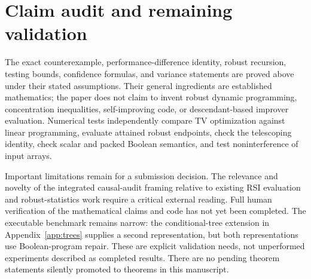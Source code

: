 \section{Claim audit and remaining validation}\label{app:claims}
The exact counterexample, performance-difference identity, robust recursion, testing bounds, confidence formulas, and variance statements are proved above under their stated assumptions. Their general ingredients are established mathematics; the paper does not claim to invent robust dynamic programming, concentration inequalities, self-improving code, or descendant-based improver evaluation. Numerical tests independently compare TV optimization against linear programming, evaluate attained robust endpoints, check the telescoping identity, check scalar and packed Boolean semantics, and test noninterference of input arrays.

Important limitations remain for a submission decision. The relevance and novelty of the integrated causal-audit framing relative to existing RSI evaluation and robust-statistics work require a critical external reading. Full human verification of the mathematical claims and code has not yet been completed. The executable benchmark remains narrow: the conditional-tree extension in Appendix~\ref{app:trees} supplies a second representation, but both representations use Boolean-program repair. These are explicit validation needs, not unperformed experiments described as completed results. There are no pending theorem statements silently promoted to theorems in this manuscript.
